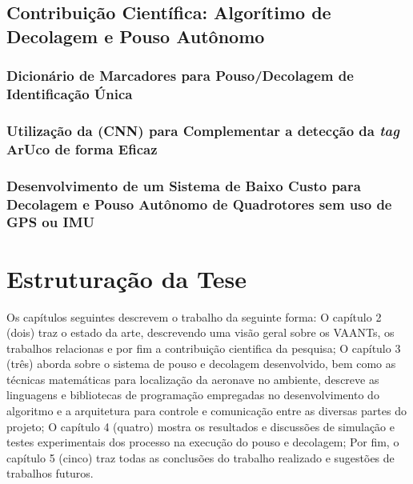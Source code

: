 
\subsection{Contribuição Científica: Algorítimo de Decolagem e Pouso Autônomo}

	\subsubsection{Dicionário de Marcadores para Pouso/Decolagem de Identificação Única}

	\subsubsection{Utilização da (CNN) para Complementar a detecção da \textit{tag} ArUco de forma Eficaz}

	\subsubsection{Desenvolvimento de um Sistema de Baixo Custo para Decolagem e Pouso Autônomo de Quadrotores sem uso de GPS ou IMU}

\section{Estruturação da Tese}

Os capítulos seguintes descrevem o trabalho da seguinte forma: O capítulo 2 (dois) traz o estado da arte, descrevendo uma visão geral sobre os VAANTs, os trabalhos relacionas e por fim a contribuição cientifica da pesquisa; O capítulo 3 (três) aborda sobre o sistema de pouso e decolagem desenvolvido, bem como as técnicas matemáticas para localização da aeronave no ambiente, descreve as linguagens e bibliotecas de programação empregadas no desenvolvimento do algoritmo e a arquitetura para controle e comunicação entre as diversas partes do projeto; O capítulo 4 (quatro) mostra os resultados e discussões de simulação e testes experimentais dos processo na execução do pouso e decolagem; Por fim, o capítulo 5 (cinco) traz todas as conclusões do trabalho realizado e sugestões de trabalhos futuros.





